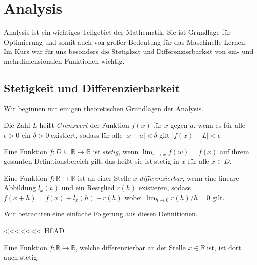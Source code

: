 \section{Analysis}

Analysis ist ein wichtiges Teilgebiet der Mathematik. Sie ist Grundlage für Optimierung und somit auch von großer Bedeutung für das Maschinelle Lernen. Im Kurs war für uns besonders die Stetigkeit und Differenzierbarkeit von ein- und mehrdimensionalen Funktionen wichtig.

\subsection{Stetigkeit und Differenzierbarkeit}

Wir beginnen mit einigen theoretischen Grundlagen der Analysis.
\begin{Def} Die Zahl $L$ heißt \emph{Grenzwert} der Funktion $f(x)$ für $x$ gegen $a$, wenn es für alle $\epsilon > 0$ ein $\delta > 0$ existiert, sodass für alle $|x-a| < \delta$ gilt $|f(x)-L|<\epsilon$
\end{Def}
\begin{Def}
Eine Funktion $f: D \subseteq \mathbb{R}\rightarrow \mathbb{R}$ ist \emph{stetig}, wenn $\lim_{w\rightarrow x}f(w)=f(x)$ auf ihrem gesamten Definitionsbereich gilt, das heißt sie ist stetig in $x$ für alle $x\in D$.
\end{Def}
\begin{Def}
Eine Funktion $f:\mathbb{R}\rightarrow \mathbb{R}$ ist an einer Stelle $x$ \emph{differenzierbar}, wenn eine lineare Abbildung $ l_ x (h)$ und ein Restglied $r(h)$ existieren, sodass $f(x+h)=f(x)+l_{x}(h)+r(h)$ wobei $\lim_{h\rightarrow 0} r(h)/h= 0$ gilt.
\end{Def}
Wir betrachten eine einfache Folgerung aus diesen Definitionen.

<<<<<<< HEAD
\begin{lemma}
Eine Funktion $f:\mathbb{R} \rightarrow \mathbb{R}$, welche differenzierbar an der Stelle $x \in \mathbb{R}$ ist, ist dort auch stetig.
\end{lemma}


